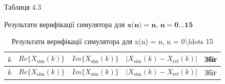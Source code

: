 \documentclass[
]{article}
\begin{document}
Таблиця 4.3

Результати верифікації симулятора для
\(\mathbf{x}\mathbf{(}\mathbf{n}\mathbf{) =}\mathbf{n}\),
\(\mathbf{n}\mathbf{=}\mathbf{0}\mathbf{\ldots}\mathbf{15}\)

\begin{longtable}[]{@{}
  >{\raggedright\arraybackslash}p{}
  >{\raggedright\arraybackslash}p{}
  >{\raggedright\arraybackslash}p{}
  >{\raggedright\arraybackslash}p{}
  >{\raggedright\arraybackslash}p{}@{}}
\caption[Результати верифікації симулятора для x(n) = n, n =
0\textbackslash ldots 15]{Результати верифікації симулятора для x(n) =
n, n = 0\textbackslash ldots 15}\tabularnewline
\toprule\noalign{}
\begin{minipage}[b]{\linewidth}\raggedright
\[k\]
\end{minipage} & \begin{minipage}[b]{\linewidth}\raggedright
\[Re\{ X_{\text{sim}}(k)\}\]
\end{minipage} & \begin{minipage}[b]{\linewidth}\raggedright
\[Im\{ X_{\text{sim}}(k)\}\]
\end{minipage} & \begin{minipage}[b]{\linewidth}\raggedright
\[|X_{\text{sim}}(k) - X_{\text{ref}}(k)|\]
\end{minipage} & \begin{minipage}[b]{\linewidth}\raggedright
Збіг
\end{minipage} \\
\midrule\noalign{}
\endfirsthead
\toprule\noalign{}
\begin{minipage}[b]{\linewidth}\raggedright
\[k\]
\end{minipage} & \begin{minipage}[b]{\linewidth}\raggedright
\[Re\{ X_{\text{sim}}(k)\}\]
\end{minipage} & \begin{minipage}[b]{\linewidth}\raggedright
\[Im\{ X_{\text{sim}}(k)\}\]
\end{minipage} & \begin{minipage}[b]{\linewidth}\raggedright
\[|X_{\text{sim}}(k) - X_{\text{ref}}(k)|\]
\end{minipage} & \begin{minipage}[b]{\linewidth}\raggedright
Збіг
\end{minipage} \\

\end{longtable}
\end{document}
